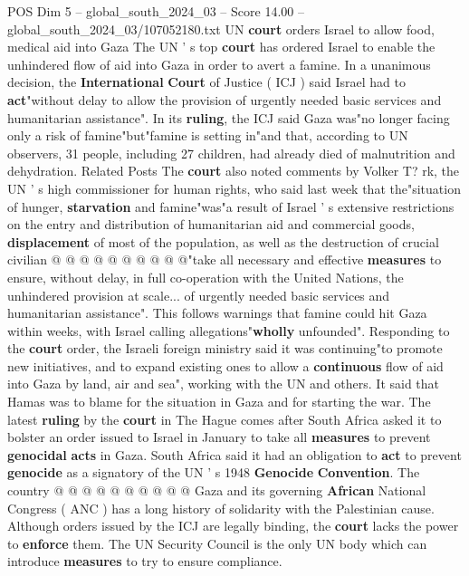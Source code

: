 \begin{textsample}{POS Dim 5 – global\_south\_2024\_03 – Score 14.00 – global\_south\_2024\_03/107052180.txt}  \label{ex:f5_pos_245}
UN \textbf{court} orders Israel to allow food, medical aid into Gaza The UN ' s top \textbf{court} has ordered Israel to enable the unhindered flow of aid into Gaza in order to avert a famine.
In a unanimous decision, the \textbf{International} \textbf{Court} of Justice ( ICJ ) said Israel had to \textbf{act}"without delay to allow the provision of urgently needed basic services and humanitarian assistance".
In its \textbf{ruling}, the ICJ said Gaza was"no longer facing only a risk of famine"but"famine is setting in"and that, according to UN observers, 31 people, including 27 children, had already died of malnutrition and dehydration.
Related Posts The \textbf{court} also noted comments by Volker T? rk, the UN ' s high commissioner for human rights, who said last week that the"situation of hunger, \textbf{starvation} and famine"was"a result of Israel ' s extensive restrictions on the entry and distribution of humanitarian aid and commercial goods, \textbf{displacement} of most of the population, as well as the destruction of crucial civilian @ @ @ @ @ @ @ @ @ @"take all necessary and effective \textbf{measures} to ensure, without delay, in full co-operation with the United Nations, the unhindered provision at scale... of urgently needed basic services and humanitarian assistance".
This follows warnings that famine could hit Gaza within weeks, with Israel calling allegations"\textbf{wholly} unfounded".
Responding to the \textbf{court} order, the Israeli foreign ministry said it was continuing"to promote new initiatives, and to expand existing ones to allow a \textbf{continuous} flow of aid into Gaza by land, air and sea", working with the UN and others.
It said that Hamas was to blame for the situation in Gaza and for starting the war.
The latest \textbf{ruling} by the \textbf{court} in The Hague comes after South Africa asked it to bolster an order issued to Israel in January to take all \textbf{measures} to prevent \textbf{genocidal} \textbf{acts} in Gaza.
South Africa said it had an obligation to \textbf{act} to prevent \textbf{genocide} as a signatory of the UN ' s 1948 \textbf{Genocide} \textbf{Convention}.
The country @ @ @ @ @ @ @ @ @ @ Gaza and its governing \textbf{African} National Congress ( ANC ) has a long history of solidarity with the Palestinian cause.
Although orders issued by the ICJ are legally binding, the \textbf{court} lacks the power to \textbf{enforce} them.
The UN Security Council is the only UN body which can introduce \textbf{measures} to try to ensure compliance.

\end{textsample}
